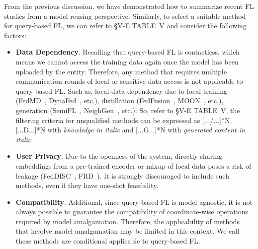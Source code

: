 \documentclass[journal]{IEEEtran}
\begin{document}
From the previous discussion, we have demonstrated how to summarize recent FL studies from a model reusing perspective.
Similarly, to select a suitable method for query-based FL, we can refer to \S{V-E} TABLE~V and consider the following factors:
\begin{itemize}
  \item \textbf{Data Dependency}. Recalling that query-based FL is contactless, which means we cannot access the training data again once the model has been uploaded by the entity.
  Therefore, any method that requires multiple communication rounds of local or sensitive data access is not applicable to query-based FL.
  Such as, local data dependency due to local training (FedMD~\cite{li2019fedmd}, DynaFed~\cite{pi2023dynafed}, etc.), distillation (FedFusion~\cite{yao2019towards}, MOON~\cite{li2021model}, etc.), generation (SemiFL~\cite{diao2022semifl}, NeighGen~\cite{zhang2021subgraph}, etc.).
  So, refer to \S{V-E} TABLE~V, the filtering criteria for unqualified methods can be expressed as [.../...]*N, [...D...]*N with \textit{knowledge in italic} and [...G...]*N with \textit{generated content in italic}.
  \item \textbf{User Privacy}. Due to the openness of the system, directly sharing embeddings from a pre-trained encoder or mixup of local data poses a risk of leakage (FedDISC~\cite{yang2023exploring}, FRD~\cite{cha2019federated}). It is strongly discouraged to include such methods, even if they have one-shot feasibility.
  \item \textbf{Compatibility}. Additional, since query-based FL is model agnostic, it is not always possible to guarantee the compatibility of coordinate-wise operations required by model amalgamation. Therefore, the applicability of methods that involve model amalgamation may be limited in this context. We call these methods are conditional applicable to query-based FL.
\end{itemize}

\end{document}
